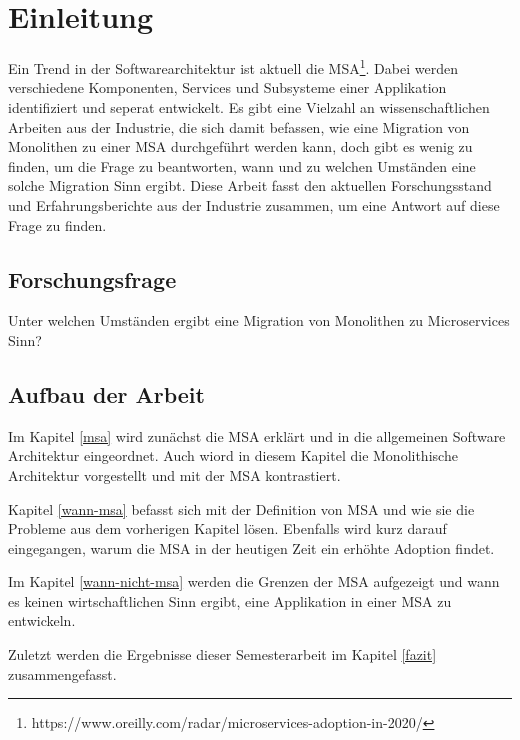 \newpage
\section{Einleitung} \label{Einleitung}

Ein Trend in der Softwarearchitektur ist aktuell die
\ac{MSA}\footnote{https://www.oreilly.com/radar/microservices-adoption-in-2020/}.
Dabei werden verschiedene Komponenten, Services und Subsysteme einer Applikation
identifiziert und seperat entwickelt. Es gibt eine Vielzahl an
wissenschaftlichen Arbeiten aus der Industrie, die sich damit befassen, wie eine
Migration von Monolithen zu einer MSA durchgeführt werden kann, doch gibt es
wenig zu finden, um die Frage zu beantworten, wann und zu welchen Umständen eine
solche Migration Sinn ergibt. Diese Arbeit fasst den aktuellen Forschungsstand
und Erfahrungsberichte aus der Industrie zusammen, um eine Antwort auf diese
Frage zu finden.

\subsection{Forschungsfrage}
Unter welchen Umständen ergibt eine Migration von Monolithen zu Microservices Sinn?

\subsection{Aufbau der Arbeit}
Im Kapitel \ref{msa} wird zunächst die MSA erklärt und in die allgemeinen
Software Architektur eingeordnet. Auch wiord in diesem Kapitel die Monolithische
Architektur vorgestellt und mit der MSA kontrastiert.

Kapitel \ref{wann-msa} befasst sich mit der Definition von MSA und wie
sie die Probleme aus dem vorherigen Kapitel lösen. Ebenfalls wird kurz darauf
eingegangen, warum die MSA in der heutigen Zeit ein erhöhte Adoption findet.

Im Kapitel \ref{wann-nicht-msa} werden die Grenzen der MSA aufgezeigt und wann
es keinen wirtschaftlichen Sinn ergibt, eine Applikation in einer MSA zu entwickeln.

Zuletzt werden die Ergebnisse dieser Semesterarbeit im Kapitel \ref{fazit}
zusammengefasst.
